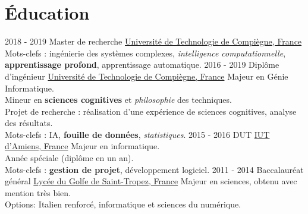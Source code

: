 \documentclass[a4paper]{twentysecondcv} %
\begin{document}
\makeprofile %


\section{Éducation}

\begin{twenty} %
	\twentyitem
    	{2018 - 2019}
        {}
        {Master de recherche}
        {\href{https://www.utc.fr/}{Université de Technologie de Compiègne, France}}
        {}
        {Mots-clefs : ingénierie des systèmes complexes, \textit{intelligence computationnelle}, \textbf{apprentissage profond}, apprentissage automatique.}
	\twentyitem
    	{2016 - 2019}
        {}
        {Diplôme d'ingénieur}
        {\href{https://www.utc.fr/}{Université de Technologie de Compiègne, France}}
        {}
        {Majeur en Génie Informatique.\\Mineur en \textbf{sciences cognitives} et \textit{philosophie} des techniques.\\Projet de recherche : réalisation d'une expérience de sciences cognitives, analyse des résultats.\\Mots-clefs : IA, \textbf{fouille de données}, \textit{statistiques}.}
	\twentyitem
    	{2015 - 2016}
        {}
        {DUT}
        {\href{http://www.iut-amiens.fr/}{IUT d'Amiens, France}}
        {}
        {Majeur en informatique.\\Année spéciale (diplôme en un an).\\Mots-clefs : \textbf{gestion de projet}, développement logiciel.}
	\twentyitem
    	{2011 - 2014}
		{}
        {Baccalauréat général}
        {\href{http://www.lyc-du-golfe-de-saint-tropez.ac-nice.fr/}{Lycée du Golfe de Saint-Tropez, France}}
        {}
        {Majeur en sciences, obtenu avec mention très bien.\\Options: Italien renforcé, informatique et sciences du numérique.}
\end{twenty}

\end{document}
